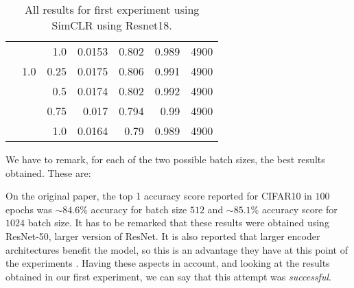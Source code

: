 \begin{table}[H]
{\begin{tabular}{rrrrrrr}
                  &               & 1.0           & 0.0153               & 0.802                   & 0.989                   & 4900          \\
                  & 1.0           & 0.25          & 0.0175               & 0.806                   & 0.991                   & 4900          \\
                  &               & 0.5           & 0.0174               & 0.802                   & 0.992                   & 4900          \\
                  &               & 0.75          & 0.017                & 0.794                   & 0.99                    & 4900          \\
                  &               & 1.0           & 0.0164               & 0.79                    & 0.989                   & 4900         
    \end{tabular}
    }
    
    \caption{All results for first experiment using SimCLR using Resnet18.}
    
    \label{table:simclr:gridsearch:1}
    \end{table}

We have to remark, for each of the two possible batch sizes, the best results obtained. These are:

\begin{table}[H]
    \label{table:best:first:simclr}
\centering
{}
\caption{Best results for the grid search experiment with SimCLR.}
\end{table}

\begin{remark}
On the original paper, the top 1 accuracy score reported for CIFAR10 in $100$ epochs was $\sim 84.6\%$ accuracy for batch size $512$ and $\sim 85.1 \%$ accuracy score for $1024$ batch size. It has to be remarked that these results were obtained using ResNet-50,  larger version of ResNet. It is also reported that larger encoder architectures benefit the model, so this is an advantage they have at this point of the experiments . Having these aspects in account, and looking at the results obtained in our first experiment, we can say that this attempt was \emph{successful}.
\end{remark}

